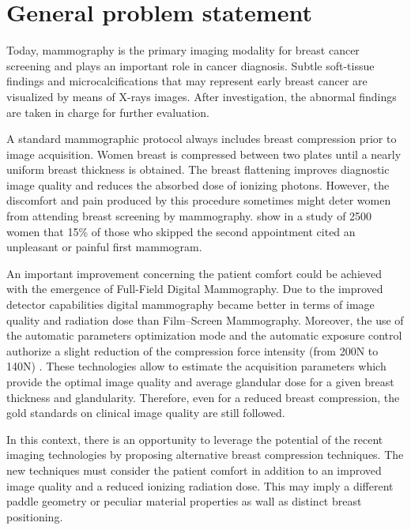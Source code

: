 \chapter*{General problem statement}
\label{section:generalproblemstatment}

Today, mammography is the primary imaging modality for breast cancer screening and plays an important role in cancer diagnosis. Subtle soft-tissue findings and microcalcifications that may represent early breast cancer are visualized by means of X-rays images. After investigation, the abnormal findings are taken in charge for further evaluation.  

A standard mammographic protocol always includes breast compression prior to image acquisition. Women breast is compressed between two plates until a nearly uniform breast thickness is obtained. The breast flattening improves diagnostic image quality and reduces the absorbed dose of ionizing photons. However, the discomfort and pain produced by this procedure sometimes might deter women from attending breast screening by mammography. \cite{fleming_intermittent_2013} show in a study of 2500 women that 15\% of those who skipped the second appointment cited an unpleasant or painful first mammogram.  

An important improvement concerning the patient comfort could be achieved with the emergence of Full-Field Digital Mammography. Due to the improved detector capabilities digital mammography became better in terms of image quality and radiation dose than Film–Screen Mammography. Moreover, the use of the automatic parameters optimization mode and the automatic exposure control  authorize a slight reduction of the compression force intensity (from 200N to 140N) . These technologies allow to estimate the acquisition parameters which provide the optimal image quality and average glandular dose for a given breast thickness and glandularity. Therefore, even for a reduced breast compression, the gold standards on clinical image quality are still followed.

In this context, there is an opportunity to leverage the potential of the recent imaging technologies by proposing alternative breast compression techniques. The new techniques must consider the patient comfort in addition to an improved image quality and a reduced ionizing radiation dose. This may imply a different paddle geometry or peculiar material properties as wall as distinct breast positioning.

